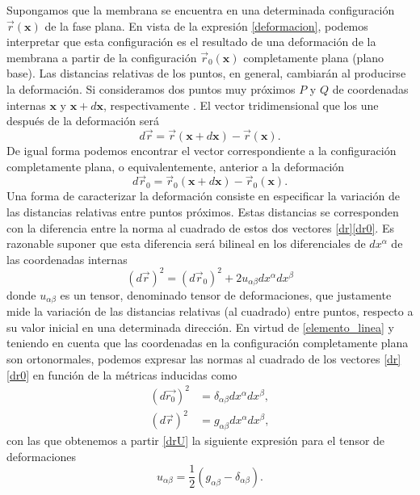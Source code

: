 Supongamos que la membrana se encuentra en una determinada configuración
$\vec{r}(\mathbf{x})$ de la fase plana. En vista de la expresión
\eqref{deformacion}, podemos interpretar que esta configuración es el
resultado de una deformación de la membrana a partir de la configuración
$\vec{r}_0(\mathbf{x})$ completamente plana (plano base). Las distancias relativas de los
puntos, en general, cambiarán al producirse la deformación. Si
consideramos dos puntos muy próximos $P$ y $Q$ de coordenadas internas
$\mathbf{x}$ y $\mathbf{x}+d\mathbf{x}$, respectivamente
\cite{Landau_Elasticidad}. El vector tridimensional que los une 
después de la deformación será
\begin{equation}\label{dr}
d\vec{r}= \vec{r}(\mathbf{x}+d\mathbf{x})-\vec{r}(\mathbf{x}).
\end{equation}
De igual forma podemos encontrar el vector correspondiente a la configuración
completamente plana, o equivalentemente, anterior a la deformación
\begin{equation}\label{dr0}
d\vec{r}_0= \vec{r}_0(\mathbf{x}+d\mathbf{x})-\vec{r}_0(\mathbf{x}).
\end{equation}
Una forma de caracterizar la deformación consiste en especificar la variación
de las distancias relativas entre puntos próximos. Estas distancias se
corresponden con la diferencia entre la norma al cuadrado de estos dos vectores
\eqref{dr}\eqref{dr0}. Es razonable suponer que esta diferencia será bilineal
en los diferenciales de $dx^{\alpha}$ de las coordenadas internas 
\begin{equation}\label{drU}
(d\vec{r})^2=(d\vec{r}_0)^2+2u_{\alpha\beta}dx^{\alpha}dx^{\beta}
\end{equation}
donde $u_{\alpha\beta}$ es un tensor, denominado tensor de deformaciones, que justamente mide
la variación de las distancias relativas (al cuadrado) entre puntos, respecto a su valor
inicial en una determinada dirección. En virtud de \eqref{elemento_linea} y
teniendo en cuenta que las coordenadas en la configuración completamente plana
son ortonormales, podemos expresar las normas al cuadrado de los vectores
\eqref{dr}\eqref{dr0} en función de la métricas inducidas como
\begin{align}
(d\vec{r_0})^2&=\delta_{\alpha\beta}dx^{\alpha}dx^{\beta},\label{Meuclidea}\\
(d\vec{r})^2&=g_{\alpha\beta}dx^{\alpha}dx^{\beta},
\end{align}
con las que obtenemos a partir \eqref{drU} la siguiente expresión para el
tensor de deformaciones
\begin{equation}\label{tensor_metrica}
u_{\alpha\beta}=\frac{1}{2}\left(g_{\alpha\beta} - \delta_{\alpha\beta}\right).
\end{equation}
